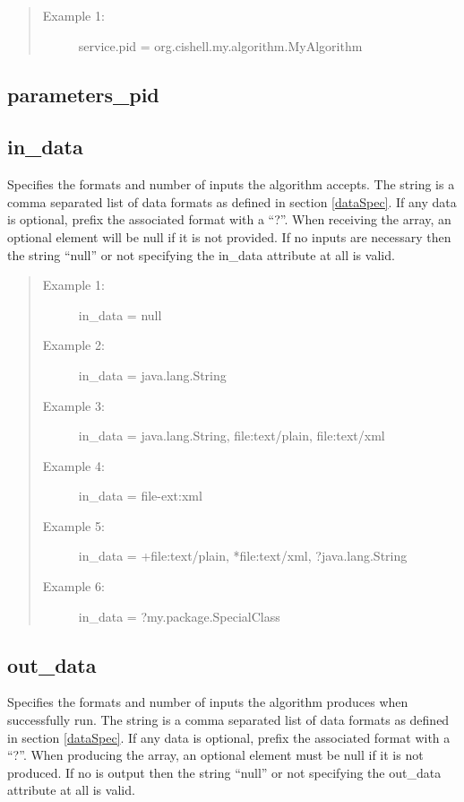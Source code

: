 \begin{quote}
\begin{description}
  \item[Example 1:] service.pid = org.cishell.my.algorithm.MyAlgorithm
\end{description}
\end{quote}


\subsection*{parameters_pid}


\subsection*{in\_data} 
Specifies the formats and number of  inputs the
algorithm accepts. The string is a comma separated list of data formats as
defined in section \ref{dataSpec}. If any data is optional, prefix the associated
format with a ``?''. When receiving the  array, an optional
 element will be null if it is not provided. If no 
inputs are necessary then the string ``null'' or not specifying the in\_data attribute
at all is valid.

\begin{quote}
\begin{description}
  \item[Example 1:] in\_data = null
  \item[Example 2:] in\_data = java.lang.String
  \item[Example 3:] in\_data = java.lang.String, file:text/plain, file:text/xml
  \item[Example 4:] in\_data = file-ext:xml
  \item[Example 5:] in\_data = +file:text/plain, *file:text/xml,
  ?java.lang.String
  \item[Example 6:] in\_data = ?my.package.SpecialClass
\end{description}
\end{quote}


\subsection*{out\_data} 
Specifies the formats and number of  inputs
the algorithm produces when successfully run. The string is a comma separated
list of data formats as defined in section \ref{dataSpec}. If any data is
optional, prefix the associated format with a ``?''. When producing the
 array, an optional  element must be null if it is not
produced. If no  is output then the string ``null'' or not specifying
the out\_data attribute at all is valid.

